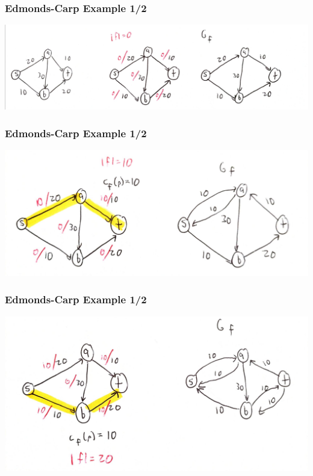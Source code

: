\documentclass{beamer}
\begin{document}
\begin{frame} \frametitle{Edmonds-Carp Example 1/2}
\begin{center}
  \includegraphics[scale=.12]{ek-1-1.jpg}
\end{center}
\end{frame}

\begin{frame} \frametitle{Edmonds-Carp Example 1/2}
\begin{center}
  \includegraphics[scale=.12]{ek-1-2.jpg}
\end{center}
\end{frame}

\begin{frame} \frametitle{Edmonds-Carp Example 1/2}
\begin{center}
  \includegraphics[scale=.12]{ek-1-3.jpg}
\end{center}
\end{frame}
\end{document}

